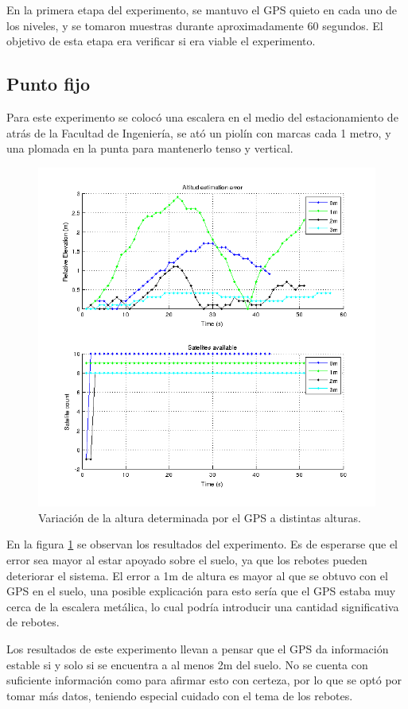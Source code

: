 \documentclass[spanish,12pt,a4paper,titlepage]{report}
\begin{document}
En la primera etapa del experimento, se mantuvo el GPS quieto en cada uno de los niveles, y se tomaron muestras durante aproximadamente 60 segundos. El objetivo de esta etapa era verificar si era viable el experimento.

\subsection{Punto fijo}
\label{sec:altura-punto-fijo}

Para este experimento se colocó una escalera en el medio del estacionamiento de atrás de la Facultad de Ingeniería, se ató un piolín con marcas cada 1 metro, y una plomada en la punta para mantenerlo tenso y vertical.

\begin{figure}[h!]
  \begin{center}
  \includegraphics[width=.7\textwidth]{./img/altura_punto_fijo_fing.png}
  \end{center}
  \caption{Variación de la altura determinada por el GPS a distintas alturas.}
  \label{fig:altura_punto_fijo_fing.png}
\end{figure}

En la figura \ref{fig:altura_punto_fijo_fing.png} se observan los resultados del experimento. Es de esperarse que el error sea mayor al estar apoyado sobre el suelo, ya que los rebotes pueden deteriorar el sistema. El error a 1m de altura es mayor al que se obtuvo con el GPS en el suelo, una posible explicación para esto sería que el GPS estaba muy cerca de la escalera metálica, lo cual podría introducir una cantidad significativa de rebotes.

Los resultados de este experimento llevan a pensar que el GPS da información estable si y solo si se encuentra a al menos 2m del suelo. No se cuenta con suficiente información como para afirmar esto con certeza, por lo que se optó por tomar más datos, teniendo especial cuidado con el tema de los rebotes.
\end{document}
